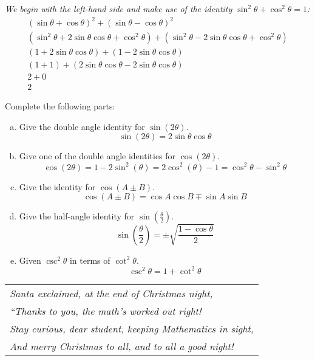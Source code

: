 \documentclass[12pt,letterpaper]{exam}
\begin{document}
\begin{questions}
{\itshape \tsol We begin with the left-hand side and make use of the identity $\sin^2 \theta + \cos^2 \theta= 1$:
	\[
	\begin{gathered}
	(\sin \theta + \cos \theta)^2 + (\sin \theta - \cos \theta)^2 \\[0.3cm]
	(\sin^2 \theta + 2 \sin \theta \cos \theta + \cos^2 \theta) + (\sin^2 \theta - 2 \sin \theta \cos \theta + \cos^2 \theta) \\[0.3cm]
	(1 + 2 \sin \theta \cos \theta) + (1 - 2 \sin \theta \cos \theta) \\[0.3cm]
	(1 + 1) + (2 \sin \theta \cos \theta - 2 \sin \theta \cos \theta) \\[0.3cm]
	2 + 0 \\[0.3cm]
	2
	\end{gathered}
	\]
}



\newpage
{} \par\vspace{0.3cm}

Complete the following parts:
	\begin{enumerate}[(a)]
	\item Give the double angle identity for $\sin(2\theta)$. \vfill
		\[
		\sin(2\theta)= 2 \sin \theta \cos \theta
		\] \vfill 
	
	\item Give one of the double angle identities for $\cos(2\theta)$. \vfill
		\[
		\cos(2\theta)= 1 - 2\sin^2(\theta)= 2\cos^2(\theta) - 1= \cos^2 \theta - \sin^2 \theta
		\] \vfill 
	
	\item Give the identity for $\cos(A \pm B)$. \vfill
		\[
		\cos(A \pm B)= \cos A \cos B \mp \sin A \sin B
		\] \vfill 
	
	\item Give the half-angle identity for $\sin\!\left( \frac{\theta}{2} \right)$. \vfill
		\[
		\sin\!\left( \frac{\theta}{2} \right)= \pm \sqrt{\dfrac{1 - \cos \theta}{2}}
		\] \vfill 
	
	\item Given $\csc^2 \theta$ in terms of $\cot^2 \theta$. \vfill
		\[
		\csc^2 \theta= 1 + \cot^2 \theta
		\] \vfill 
	\end{enumerate}

\end{questions}


\newpage

\phantom{.} \vfill
	\begin{table}[h]
	\centering
	\begin{tabular}{l}
	{\itshape Santa exclaimed, at the end of Christmas night,} \\
	{\itshape ``Thanks to you, the math's worked out right!} \\
	{\itshape Stay curious, dear student, keeping Mathematics in sight,} \\
	{\itshape And merry Christmas to all, and to all a good night!}
	\end{tabular}
	\end{table}
\phantom{.} \vfill
\end{document}
